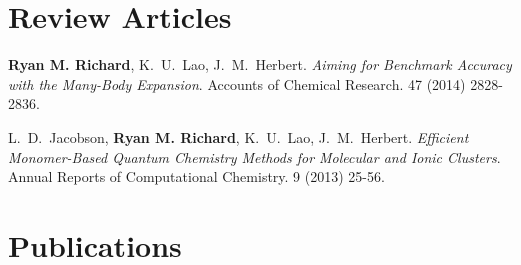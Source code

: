 \documentclass[11pt,a4paper,sans]{moderncv}
\begin{document}
\section{Review Articles}
\vspace{5pt}
\begin{etaremune}
	\item{\textbf{Ryan M. Richard}, K.~U.~Lao, J.~M.~Herbert.  {\em Aiming for Benchmark Accuracy with the Many-Body Expansion}.  Accounts of Chemical Research.  47 (2014) 2828-2836.}
	\item{L.~D.~Jacobson, \textbf{Ryan M. Richard}, K.~U.~Lao, J.~M.~Herbert.  {\em Efficient Monomer-Based Quantum Chemistry Methods for Molecular and Ionic Clusters}.  Annual Reports of Computational Chemistry.  9 (2013) 25-56.}
\end{etaremune}

\section{Publications}

\vspace{5pt}
\end{document}
